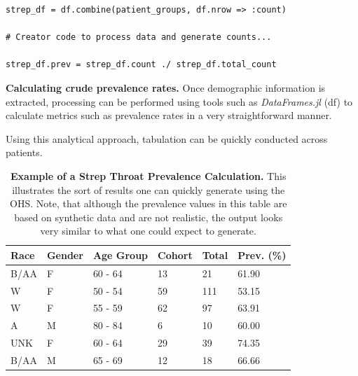\documentclass{juliacon}
\begin{document}

\begin{listing}[!ht]
\begin{verbatim}
strep_df = df.combine(patient_groups, df.nrow => :count)

# Creator code to process data and generate counts...

strep_df.prev = strep_df.count ./ strep_df.total_count 
\end{verbatim}
\caption{\textbf{Calculating crude prevalence rates.} Once demographic information is extracted, processing can be performed using tools such as \textit{DataFrames.jl} (df) to calculate metrics such as prevalence rates in a very straightforward manner.}
\label{listing:prevalence}
\end{listing}

Using this analytical approach, tabulation can be quickly conducted across patients.


\begin{table}[!ht]
    \centering
    \begin{tabular}{|l|l|l|l|l|l|}
    \hline
        Race & Gender & Age Group & Cohort & Total & Prev. (\%) \\ \hline
        B/AA & F & 60 - 64 & 13 & 21 & 61.90 \\ \hline
        W & F & 50 - 54 & 59 & 111 & 53.15 \\ \hline
        W & F & 55 - 59 & 62 & 97 & 63.91 \\ \hline
        A & M & 80 - 84 & 6 & 10 & 60.00 \\ \hline
        UNK & F & 60 - 64 & 29 & 39 & 74.35 \\ \hline
        B/AA & M & 65 - 69 & 12 & 18 & 66.66 \\ \hline
    \end{tabular}
    \caption{\textbf{Example of a Strep Throat Prevalence Calculation.} This illustrates the sort of results one can quickly generate using the OHS. Note, that although the prevalence values in this table are based on synthetic data and are not realistic, the output looks very similar to what one could expect to generate.}
    \label{table:eunomia_prevalence}
\end{table}
\end{document}
